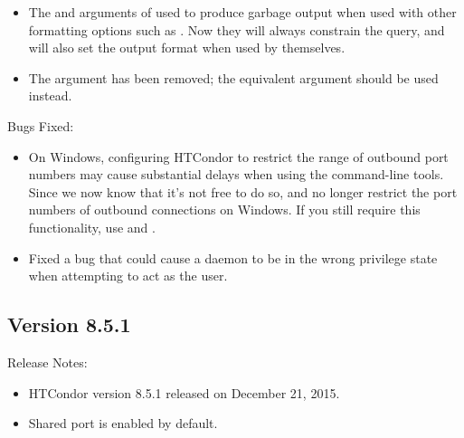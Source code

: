 \begin{itemize}
\item The  and  arguments of  used to produce garbage output
when used with other formatting options such as .  Now they will always constrain
the query, and will also set the output format when used by themselves.

\item The   argument has been removed;
the equivalent  argument should be used instead.

\end{itemize}

\noindent Bugs Fixed:

\begin{itemize}

\item On Windows, configuring HTCondor to restrict the range of outbound
port numbers may cause substantial delays when using the command-line
tools.  Since we now know that it's not free to do so, 
and  no longer restrict the port numbers of outbound
connections on Windows.  If you still require this functionality, use
 and .

\item Fixed a bug that could cause a daemon to be in the wrong
privilege state when attempting to act as the user.

\end{itemize}


\subsection*{\label{sec:New-8-5-1}Version 8.5.1}

\noindent Release Notes:

\begin{itemize}

\item HTCondor version 8.5.1 released on December 21, 2015.

\item Shared port is enabled by default.

\end{itemize}


